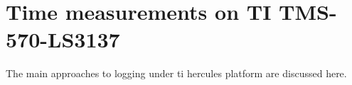 \section{Time measurements on TI TMS-570-LS3137}
The main approaches to logging under ti hercules platform are discussed here.
